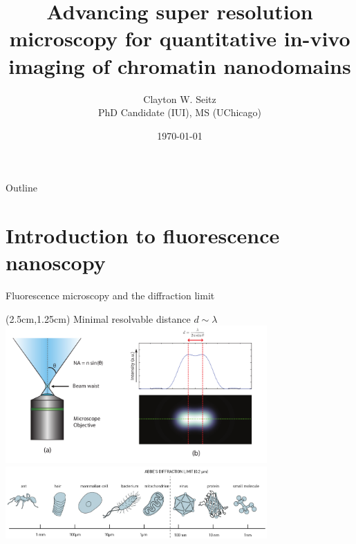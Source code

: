 \documentclass{beamer}					%
\title{Advancing super resolution microscopy for quantitative in-vivo imaging of chromatin nanodomains}	%
\author{Clayton W. Seitz\\ PhD Candidate (IUI), MS (UChicago)}								%
\date{\today}									%
\begin{document}
\begin{frame}
  \titlepage
\end{frame}

\begin{frame}{Outline}
    \tableofcontents
\end{frame}



%

\section{Introduction to fluorescence nanoscopy}

\begin{frame}{Fluorescence microscopy and the diffraction limit}

\begin{textblock*}{9cm}(2.5cm,1.25cm)
Minimal resolvable distance $d \sim \lambda$
\includegraphics[width=10cm]{../../dissertation/dissertation/media/Limit}
\includegraphics[width=10cm]{../../dissertation/dissertation/media/Scale}
\end{textblock*}

\end{frame}
\end{document}
